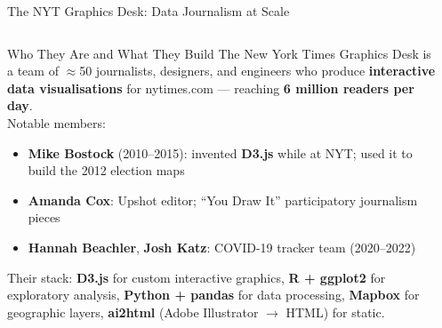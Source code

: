 \documentclass[aspectratio=169,10pt]{beamer}
\begin{document}
\begin{frame}{The NYT Graphics Desk: Data Journalism at Scale}
  \begin{columns}[T]
      \begin{block}{Who They Are and What They Build}
        The New York Times Graphics Desk is a team of
        $\approx$50 journalists, designers, and engineers who
        produce \textbf{interactive data visualisations} for
        nytimes.com — reaching \textbf{6 million readers per day}.\\[5pt]
        Notable members:
        \begin{itemize}
          \item \textbf{Mike Bostock} (2010--2015):
                invented \textbf{D3.js} while at NYT;
                used it to build the 2012 election maps
          \item \textbf{Amanda Cox}: Upshot editor;
                ``You Draw It'' participatory journalism pieces
          \item \textbf{Hannah Beachler}, \textbf{Josh Katz}:
                COVID-19 tracker team (2020--2022)
        \end{itemize}
        Their stack: \textbf{D3.js} for custom interactive graphics,
        \textbf{R + ggplot2} for exploratory analysis,
        \textbf{Python + pandas} for data processing,
        \textbf{Mapbox} for geographic layers,
        \textbf{ai2html} (Adobe Illustrator $\to$ HTML) for static.
      \end{block}

      \begin{center}
\end{center}
\end{columns}
\end{frame}
\end{document}
